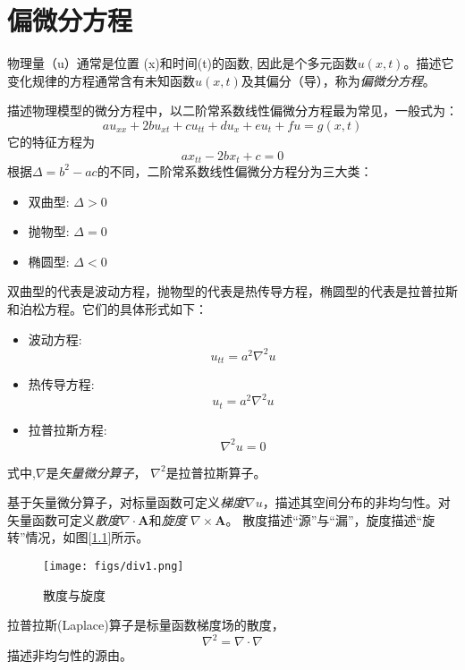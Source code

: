 \chapter{偏微分方程}
物理量（u）通常是位置 (x)和时间(t)的函数, 因此是个多元函数$u(x,t)$。描述它变化规律的方程通常含有未知函数$u(x,t)$及其偏分（导），称为\emph{偏微分方程}。

描述物理模型的微分方程中，以二阶常系数线性偏微分方程最为常见，一般式为：
\begin{equation}
	au_{xx}+2bu_{xt}+cu_{tt}+du_x+eu_t+fu=g(x,t)
\end{equation}
它的特征方程为
\begin{equation*}
	ax_{tt}-2bx_{t}+c=0
\end{equation*}
根据$\Delta=b^2-ac$的不同，二阶常系数线性偏微分方程分为三大类：
\begin{itemize}
	\item 双曲型: $\Delta>0$
	\item 抛物型: $\Delta=0$
	\item 椭圆型: $\Delta<0$
\end{itemize}
双曲型的代表是波动方程，抛物型的代表是热传导方程，椭圆型的代表是拉普拉斯和泊松方程。它们的具体形式如下：
\begin{itemize}
	\item 波动方程: \begin{equation}u_{tt} = a^2 \nabla ^2 u \end{equation}
	\item 热传导方程: \begin{equation}u_t = a^2 \nabla ^2 u \end{equation}
	\item 拉普拉斯方程: \begin{equation}\nabla ^2 u = 0 \end{equation}	
\end{itemize} 
式中,$\nabla $是\emph{矢量微分算子}， $\nabla^2$是拉普拉斯算子。

基于矢量微分算子，对标量函数可定义\emph{梯度}$\nabla u$，描述其空间分布的非均匀性。对矢量函数可定义\emph{散度}$\nabla \cdot \mathbf{A} $和\emph{旋度} $\nabla \times \mathbf{A} $。
散度描述“源”与“漏”，旋度描述“旋转”情况，如图[\ref{fig:div}]所示。
	\begin{figure}[h]
		\centering
		\texttt{[image: figs/div1.png]}
		\caption{散度与旋度}
		\label{fig:div}
	\end{figure}

拉普拉斯(Laplace)算子是标量函数梯度场的散度，
	\begin{equation}
		\nabla ^2 = \nabla \cdot \nabla
	\end{equation}
描述非均匀性的源由。
	
